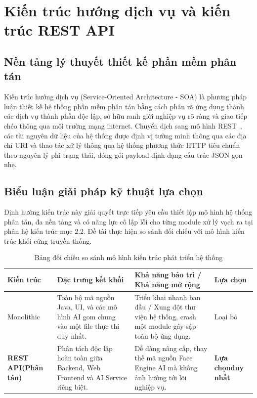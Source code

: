﻿\documentclass[../DoAn.tex]{subfiles}
\begin{document}
\section{Kiến trúc hướng dịch vụ và kiến trúc REST API}
\label{section:3.4}

\subsection{Nền tảng lý thuyết thiết kế phần mềm phân tán}

Kiến trúc hướng dịch vụ (Service-Oriented Architecture - SOA) là phương pháp luận thiết kế hệ thống phần mềm phân tán bằng cách phân rã ứng dụng thành các dịch vụ thành phần độc lập, sở hữu ranh giới nghiệp vụ rõ ràng và giao tiếp chéo thông qua môi trường mạng internet. Chuyển dịch sang mô hình REST~\cite{fielding2000}, các tài nguyên dữ liệu của hệ thống được định vị tường minh thông qua các địa chỉ URI và thao tác xử lý thông qua hệ thống phương thức HTTP tiêu chuẩn theo nguyên lý phi trạng thái, đóng gói payload định dạng cấu trúc JSON gọn nhẹ.

\subsection{Biểu luận giải pháp kỹ thuật lựa chọn}

Định hướng kiến trúc này giải quyết trực tiếp yêu cầu thiết lập mô hình hệ thống phân tán, đa nền tảng và có năng lực cô lập lỗi cho từng module xử lý vạch ra tại phân hệ kiến trúc mục 2.2. Đề tài thực hiện so sánh đối chiếu với mô hình kiến trúc khối cứng truyền thống.

\begin{table}[ht!]
\centering
\small
\renewcommand{\arraystretch}{1.3}
\caption{Bảng đối chiếu so sánh mô hình kiến trúc phát triển hệ thống}
\label{tab:architecture_comparison}
\begin{tabular}{|>{\raggedright\arraybackslash}p{2.3cm}|>{\raggedright\arraybackslash}p{4.5cm}|>{\raggedright\arraybackslash}p{5.5cm}|>{\centering\arraybackslash}p{1.7cm}|}
\hline
\textbf{Kiến trúc} & \textbf{Đặc trưng kết khối} & \textbf{Khả năng bảo trì / Khả năng mở rộng} & \textbf{Lựa chọn} \\ \hline
Monolithic & Toàn bộ mã nguồn Java, UI, và các mô hình AI gom chung vào một file thực thi duy nhất. & Triển khai nhanh ban đầu / Xung đột thư viện hệ thống, crash một module gây sập toàn bộ ứng dụng. & Loại bỏ \\ \hline
\textbf{REST API\newline (Phân tán)} & Phân tách độc lập hoàn toàn giữa Backend, Web Frontend và AI Service riêng biệt. & Dễ dàng nâng cấp, thay thế mã nguồn Face Engine AI mà không ảnh hưởng tới lõi nghiệp vụ. & \textbf{Lựa chọn\newline duy nhất} \\ \hline
\end{tabular}
\end{table}
\end{document}
